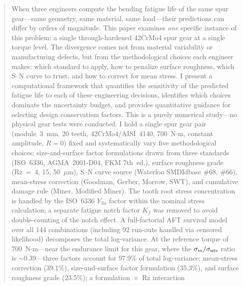 \documentclass[12pt,a4paper]{article}
\begin{document}
\begin{abstract}
\label{sec:abstract}

When three engineers compute the bending fatigue life of the same spur
gear---same geometry, same material, same load---their predictions can
differ by orders of magnitude. This paper examines \emph{one}
specific instance of this problem: a single through-hardened 42CrMo4
spur gear at a single torque level. The divergence comes not from
material variability or manufacturing defects, but from the
methodological choices each engineer makes: which standard to apply, how
to penalize surface roughness, which S--N curve to trust, and how to
correct for mean stress. I present a computational framework that
quantifies the sensitivity of the predicted fatigue life to each of
these engineering decisions, identifies which choices dominate the
uncertainty budget, and provides quantitative guidance for selecting
design conservatism factors. This is a purely numerical study---no
physical gear tests were conducted. I hold a single spur gear pair
(module~3~mm,%
20 teeth,%
42CrMo4/AISI~4140,%
700~N$\cdot$m,%
constant amplitude, $R=0$) fixed and systematically vary five methodological%
choices: size-and-surface factor formulations drawn from three standards
(ISO~6336, AGMA~2001-D04, FKM 7th~ed.), surface
roughness grade (Rz~=~4, 15, 50~$\mu$m), S--N curve source (Waterloo
SMDIdbase \#68, \#66), mean-stress correction (Goodman, Gerber, Morrow,
SWT), and cumulative damage rule (Miner, Modified Miner). The tooth
root stress concentration is handled by the ISO~6336 $Y_{Sa}$ factor
within the nominal stress calculation; a separate fatigue notch factor
$K_f$ was removed to avoid double-counting of the notch effect. A
full-factorial AFT survival model over all 144 combinations (including
92 run-outs handled via censored likelihood) decomposes the total
log-variance. At the reference torque of 700~N$\cdot$m---near the
endurance limit for this gear, where the $\sigma_m/\sigma_{\rm uts}$
ratio is $\sim$0.39---three factors account for 97.9\% of total log-variance:
mean-stress correction (39.1\%), size-and-surface factor formulation (35.3\%), and
surface roughness grade (23.5\%); a formulation~$\times$~Rz interaction

\end{abstract}
\end{document}
